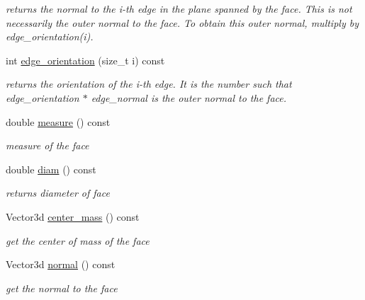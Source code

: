 \begin{DoxyCompactItemize}
\begin{DoxyCompactList}\small\item\em returns the normal to the i-\/th edge in the plane spanned by the face. This is not necessarily the outer normal to the face. To obtain this outer normal, multiply by edge\+\_\+orientation(i). \end{DoxyCompactList}\item 
\mbox{\label{classHArDCore3D_1_1Face_aa02d3eab7ba590dec07134da1f85dbeb}} 
int \hyperlink{classHArDCore3D_1_1Face_aa02d3eab7ba590dec07134da1f85dbeb}{edge\+\_\+orientation} (size\+\_\+t i) const
\begin{DoxyCompactList}\small\item\em returns the orientation of the i-\/th edge. It is the number such that edge\+\_\+orientation $\ast$ edge\+\_\+normal is the outer normal to the face. \end{DoxyCompactList}\item 
double \hyperlink{group__Mesh_gad8284631ae078f8f5a15147b7b1014a1}{measure} () const
\begin{DoxyCompactList}\small\item\em measure of the face \end{DoxyCompactList}\item 
double \hyperlink{group__Mesh_ga3303318a9f1465bf279617959644b01a}{diam} () const
\begin{DoxyCompactList}\small\item\em returns diameter of face \end{DoxyCompactList}\item 
\mbox{\label{classHArDCore3D_1_1Face_ac5d883f4f09a9af506924638939bb35a}} 
Vector3d \hyperlink{classHArDCore3D_1_1Face_ac5d883f4f09a9af506924638939bb35a}{center\+\_\+mass} () const
\begin{DoxyCompactList}\small\item\em get the center of mass of the face \end{DoxyCompactList}\item 
\mbox{\label{classHArDCore3D_1_1Face_af2b13fd21cb283d14878c2ea25727e1f}} 
Vector3d \hyperlink{classHArDCore3D_1_1Face_af2b13fd21cb283d14878c2ea25727e1f}{normal} () const
\begin{DoxyCompactList}\small\item\em get the normal to the face \end{DoxyCompactList}\item 

\end{DoxyCompactItemize}
